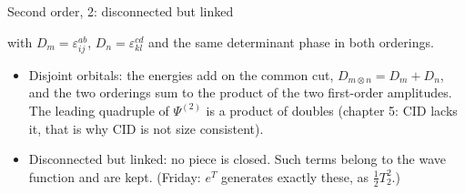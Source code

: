 \documentclass[aspectratio=169,10pt]{beamer}
\begin{document}
\begin{frame}{Second order, 2: disconnected but linked}
\[\]
\centerline{\small with $D_m=\varepsilon_{ij}^{ab}$, $D_n=\varepsilon_{kl}^{cd}$ and the same determinant phase in both orderings.}
\begin{itemize}
\item Disjoint orbitals: the energies add on the common cut, $D_{m\otimes n}=D_m+D_n$, and the two orderings sum to the \alert{product of the two first-order amplitudes}. The leading quadruple of $\Psi^{(2)}$ is a product of doubles (chapter 5: CID lacks it, that is why CID is not size consistent).
\item \alert{Disconnected but linked}: no piece is closed. Such terms belong to the wave function and are kept. (Friday: $e^{T}$ generates exactly these, as $\tfrac12T_2^2$.)
\end{itemize}
\end{frame}
\end{document}

